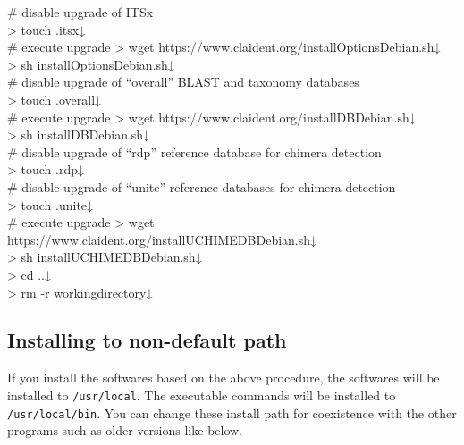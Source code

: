 \documentclass[titlepage,10pt,a4paper,english]{jsbook}
\newenvironment{cmd}{\begin{oframed}\raggedright\ttfamily\footnotesize\setlength{\baselineskip}{1.4em}}{\end{oframed}\vspace{-1em}}
\begin{document}
\begin{cmd}
\# disable upgrade of ITSx\\
{\textgreater} touch .itsx↓\\
\# execute upgrade
{\textgreater} wget https://www.claident.org/installOptions{\textunderscore}Debian.sh↓\\
{\textgreater} sh installOptions{\textunderscore}Debian.sh↓\\
\# disable upgrade of ``overall'' BLAST and taxonomy databases\\
{\textgreater} touch .overall↓\\
\# execute upgrade
{\textgreater} wget https://www.claident.org/installDB{\textunderscore}Debian.sh↓\\
{\textgreater} sh installDB{\textunderscore}Debian.sh↓\\
\# disable upgrade of ``rdp'' reference database for chimera detection\\
{\textgreater} touch .rdp↓\\
\# disable upgrade of ``unite'' reference databases for chimera detection\\
{\textgreater} touch .unite↓\\
\# execute upgrade
{\textgreater} wget https://www.claident.org/installUCHIMEDB{\textunderscore}Debian.sh↓\\
{\textgreater} sh installUCHIMEDB{\textunderscore}Debian.sh↓\\
{\textgreater} cd ..↓\\
{\textgreater} rm -r workingdirectory↓
\end{cmd}

\subsection{Installing to non-default path}

If you install the softwares based on the above procedure, the softwares will be installed to \texttt{/usr/local}.
The executable commands will be installed to \texttt{/usr/local/bin}.
You can change these install path for coexistence with the other programs such as older versions like below.
\end{document}
